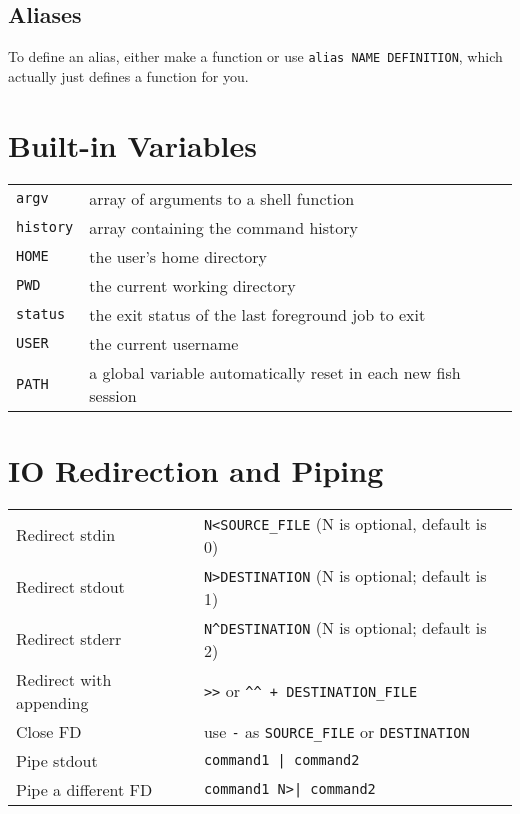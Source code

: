\documentclass[10pt]{extarticle}
\begin{document}
\begin{paracol}{2}
\subsection*{Aliases}
To define an alias, either make a function or use \texttt{alias NAME
DEFINITION}, which actually just defines a function for you.

\switchcolumn

\section*{Built-in Variables}

\begin{tabularx}{\columnwidth}{X X}
    \texttt{argv} & array of arguments to a shell function\\
    \texttt{history} & array containing the command history\\
    \texttt{HOME} & the user's home directory\\
    \texttt{PWD} & the current working directory\\
    \texttt{status} & the exit status of the last foreground job to exit\\
    \texttt{USER} & the current username \\
    \texttt{PATH} & a global variable automatically reset in each new fish session
\end{tabularx}


\section*{IO Redirection and Piping}

\begin{tabularx}{\columnwidth}{X X}

    Redirect stdin & \texttt{N<SOURCE\_FILE} (N is optional, default is 0) \\
    Redirect stdout & \texttt{N>DESTINATION} (N is optional; default is 1) \\
    Redirect stderr & \texttt{N\^{}DESTINATION} (N is optional; default is 2) \\
    Redirect with appending & \texttt{>>} or \texttt{\^{}\^{} + DESTINATION\_FILE} \\
    Close FD & use \texttt{-} as \texttt{SOURCE\_FILE} or \texttt{DESTINATION} \\
    Pipe stdout & \texttt{command1 | command2} \\
    Pipe a different FD & \texttt{command1 N>| command2} \\


\end{tabularx}
\end{paracol}
\end{document}
